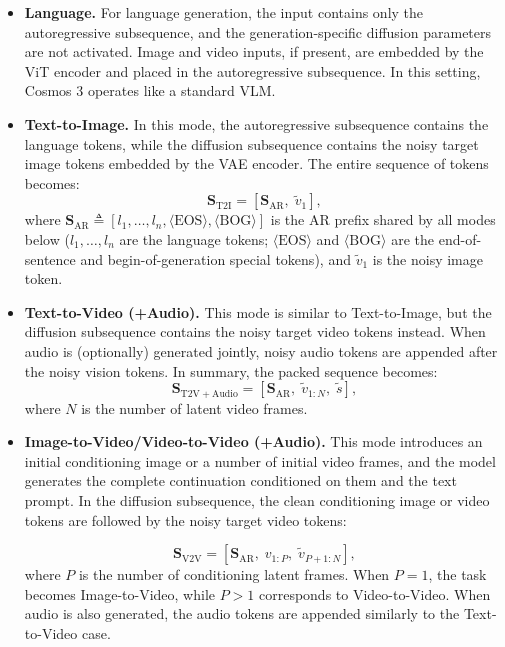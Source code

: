 \documentclass{llmxive}
\providecommand{\txtvar}{l}
\providecommand{\vidvar}{v}
\providecommand{\audiovar}{s}
\providecommand{\txttok}{\txtvar}
\providecommand{\vidtok}{\vidvar}
\providecommand{\noisyvidvar}{\tilde{\vidvar}}
\providecommand{\noisyaudiovar}{\tilde{\audiovar}}
\providecommand{\noisyvidtok}{\noisyvidvar}
\providecommand{\noisyaudiotok}{\noisyaudiovar}
\providecommand{\txttokseq}{\txttok_{1},\ldots,\txttok_{n}}
\providecommand{\eostok}{\langle\text{EOS}\rangle}
\providecommand{\bovtok}{\langle\text{BOG}\rangle}
\providecommand{\preseq}{\mathbf{S}_{\mathrm{AR}}}
\begin{document}
\begin{itemize}
    \item \textbf{Language.} For language generation, the input contains only the autoregressive subsequence, and the generation-specific diffusion parameters are not activated. Image and video inputs, if present, are embedded by the ViT encoder and placed in the autoregressive subsequence. In this setting, Cosmos 3 operates like a standard VLM.
    \item \textbf{Text-to-Image.} In this mode, the autoregressive subsequence contains the language tokens, while the diffusion subsequence contains the noisy target image tokens embedded by the VAE encoder. The entire sequence of tokens becomes:
    \begin{equation}
    \mathbf{S}_{\mathrm{T2I}} = [\preseq,\; \noisyvidtok_{1}],
    \end{equation}
    where $\preseq \triangleq [\txttokseq, \eostok, \bovtok]$ is the AR prefix shared by all modes below ($\txttokseq$ are the language tokens; $\eostok$ and $\bovtok$ are the end-of-sentence and begin-of-generation special tokens), and $\noisyvidtok_{1}$ is the noisy image token.
    \item \textbf{Text-to-Video (+Audio).} This mode is similar to Text-to-Image, but the diffusion subsequence contains the noisy target video tokens instead. When audio is (optionally) generated jointly, noisy audio tokens are appended after the noisy vision tokens. In summary, the packed sequence becomes:
    \begin{equation}
    \mathbf{S}_{\mathrm{T2V+Audio}} = [\preseq,\; \noisyvidtok_{1:N},\; \noisyaudiotok],
    \end{equation}
    where $N$ is the number of latent video frames.

    \item \textbf{Image-to-Video/Video-to-Video (+Audio).} This mode introduces an initial conditioning image or a number of initial video frames, and the model generates the complete continuation conditioned on them and the text prompt. In the diffusion subsequence, the clean conditioning image or video tokens are followed by the noisy target video tokens:

    \begin{equation}
    \mathbf{S}_{\mathrm{V2V}} = [\preseq,\; \vidtok_{1:P},\; \noisyvidtok_{P+1:N}],
    \end{equation}
    where $P$ is the number of conditioning latent frames. When $P=1$, the task becomes Image-to-Video, while $P>1$ corresponds to Video-to-Video. When audio is also generated, the audio tokens are appended similarly to the Text-to-Video case.


\end{itemize}
\end{document}
